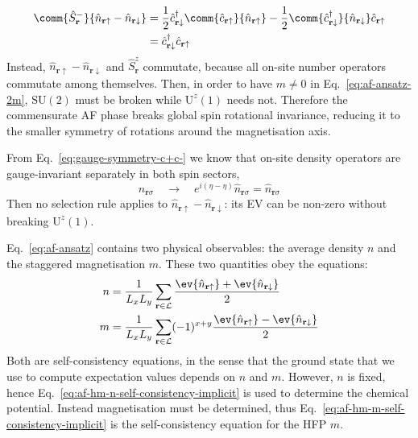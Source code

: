 \begin{tabproof}
\[\begin{aligned}
		\comm{\hat S_\mathbf{r}^-}{\hat n_{\mathbf{r}\uparrow} - \hat n_{\mathbf{r}\downarrow}} &= \frac{1}{2} \hat c_{\mathbf{r}\downarrow}^\dagger \comm{\hat c_{\mathbf{r}\uparrow}}{\hat n_{\mathbf{r}\uparrow}} - \frac{1}{2} \comm{\hat c_{\mathbf{r}\downarrow}^\dagger}{\hat n_{\mathbf{r}\downarrow}} \hat c_{\mathbf{r}\uparrow} \\
		&= \hat c_{\mathbf{r}\downarrow}^\dagger \hat c_{\mathbf{r}\uparrow}
	\end{aligned}
	\]
	Instead, $\hat n_{\mathbf{r}\uparrow} - \hat n_{\mathbf{r}\downarrow}$ and $\hat S_\mathbf{r}^z$ commutate, because all on-site number operators commutate among themselves. Then, in order to have $m \neq 0$ in Eq.~\eqref{eq:af-ansatz-2m}, $\mathrm{SU}(2)$ must be broken while $\mathrm{U}^z(1)$ needs not. Therefore the commensurate AF phase breaks global spin rotational invariance, reducing it to the smaller symmetry of rotations around the magnetisation axis.
	
\end{tabproof}

\begin{tabproof}
	
	From Eq.~\eqref{eq:gauge-symmetry-c+c-} we know that on-site density operators are gauge-invariant separately in both spin sectors,
	\[
	\hat n_{\mathbf{r}\sigma}
	\quad\to\quad
	e^{i(\eta - \eta)} \hat n_{\mathbf{r}\sigma} = \hat n_{\mathbf{r}\sigma}
	\]
	Then no selection rule applies to $\hat n_{\mathbf{r}\uparrow} - \hat n_{\mathbf{r}\downarrow}$: its EV can be non-zero without breaking $\mathrm{U}^z(1)$.
	
\end{tabproof}

Eq.~\eqref{eq:af-ansatz} contains two physical observables: the average density $n$ and the staggered magnetisation $m$. These two quantities obey the equations:
\begin{align}
	n &= \frac{1}{L_x L_y} \sum_{\mathbf{r}\in\mathcal{L}} \frac{\ev{\hat n_{\mathbf{r}\uparrow}} + \ev{\hat n_{\mathbf{r}\downarrow}}}{2} \label{eq:af-hm-n-self-consistency-implicit}\\
	m &= \frac{1}{L_x L_y} \sum_{\mathbf{r}\in\mathcal{L}} (-1)^{x+y} \frac{\ev{\hat n_{\mathbf{r}\uparrow}} - \ev{\hat n_{\mathbf{r}\downarrow}}}{2} \label{eq:af-hm-m-self-consistency-implicit}
\end{align}
Both are self-consistency equations, in the sense that the ground state that we use to compute expectation values depends on $n$ and $m$. However, $n$ is fixed, hence Eq.~\eqref{eq:af-hm-n-self-consistency-implicit} is used to determine the chemical potential. Instead magnetisation must be determined, thus Eq.~\eqref{eq:af-hm-m-self-consistency-implicit} is the self-consistency equation for the HFP $m$.

